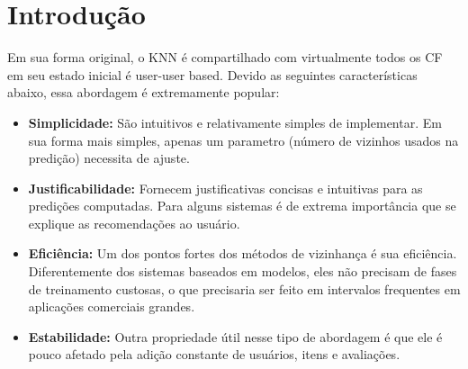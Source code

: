 \section{Introdução}

\par
Em sua forma original, o KNN é compartilhado com virtualmente todos os CF em seu estado inicial é user-user based. Devido as seguintes características abaixo, essa abordagem é extremamente popular:

\begin{itemize}
  \item \textbf{Simplicidade:} São intuitivos e relativamente simples de implementar. Em sua forma mais simples, apenas um parametro (número de vizinhos usados na predição) necessita de ajuste.
  \item \textbf{Justificabilidade:} Fornecem justificativas concisas e intuitivas para as predições computadas. Para alguns sistemas é de extrema importância que se explique as recomendações ao usuário.
  \item \textbf{Eficiência:} Um dos pontos fortes dos métodos de vizinhança é sua eficiência. Diferentemente dos sistemas baseados em modelos, eles não precisam de fases de treinamento custosas, o que precisaria ser feito em intervalos frequentes em aplicações comerciais grandes.
   \item \textbf{Estabilidade:} Outra propriedade útil nesse tipo de abordagem é que ele é pouco afetado pela adição constante de usuários, itens e avaliações.
\end{itemize}
